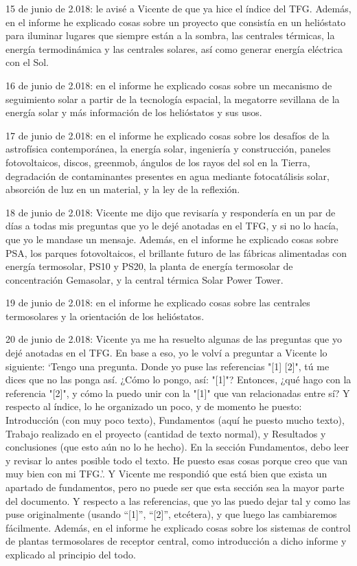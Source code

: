 \documentclass[12pt]{article}
\begin{document}
15 de junio de 2.018: le avisé a Vicente de que ya hice el índice del TFG. Además, en el informe he explicado cosas sobre un proyecto que consistía en un helióstato para iluminar lugares que siempre están a la sombra, las centrales térmicas, la energía termodinámica y las centrales solares, así como generar energía eléctrica con el Sol.

16 de junio de 2.018: en el informe he explicado cosas sobre un mecanismo de seguimiento solar a partir de la tecnología espacial, la megatorre sevillana de la energía solar y más información de los helióstatos y sus usos.

17 de junio de 2.018: en el informe he explicado cosas sobre los desafíos de la astrofísica contemporánea, la energía solar, ingeniería y construcción, paneles fotovoltaicos, discos, greenmob, ángulos de los rayos del sol en la Tierra, degradación de contaminantes presentes en agua mediante fotocatálisis solar, absorción de luz en un material, y la ley de la reflexión.

18 de junio de 2.018: Vicente me dijo que revisaría y respondería en un par de días a todas mis preguntas que yo le dejé anotadas en el TFG, y si no lo hacía, que yo le mandase un mensaje. Además, en el informe he explicado cosas sobre PSA, los parques fotovoltaicos, el brillante futuro de las fábricas alimentadas con energía termosolar, PS10 y PS20, la planta de energía termosolar de concentración Gemasolar, y la central térmica Solar Power Tower.

19 de junio de 2.018: en el informe he explicado cosas sobre las centrales termosolares y la orientación de los helióstatos.

20 de junio de 2.018: Vicente ya me ha resuelto algunas de las preguntas que yo dejé anotadas en el TFG. En base a eso, yo le volví a preguntar a Vicente lo siguiente: ‘Tengo una pregunta. Donde yo puse las referencias "[1] [2]", tú me dices que no las ponga así. ¿Cómo lo pongo, así: "[1]"? Entonces, ¿qué hago con la referencia "[2]", y cómo la puedo unir con la "[1]" que van relacionadas entre sí? Y respecto al índice, lo he organizado un poco, y de momento he puesto: Introducción (con muy poco texto), Fundamentos (aquí he puesto mucho texto), Trabajo realizado en el proyecto (cantidad de texto normal), y Resultados y conclusiones (que esto aún no lo he hecho). En la sección Fundamentos, debo leer y revisar lo antes posible todo el texto. He puesto esas cosas porque creo que van muy bien con mi TFG.’. Y Vicente me respondió que está bien que exista un apartado de fundamentos, pero no puede ser que esta sección sea la mayor parte del documento. Y respecto a las referencias, que yo las puedo dejar tal y como las puse originalmente (usando “[1]”, “[2]”, etcétera), y que luego las cambiaremos fácilmente. Además, en el informe he explicado cosas sobre los sistemas de control de plantas termosolares de receptor central, como introducción a dicho informe y explicado al principio del todo.
\end{document}
